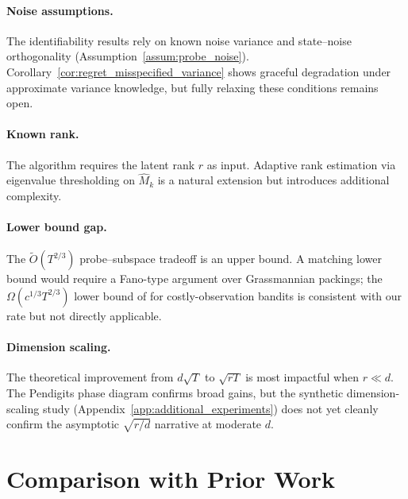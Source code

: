 \documentclass{article}
\begin{document}
\paragraph{Noise assumptions.}
The identifiability results rely on known noise variance and state--noise orthogonality (Assumption~\ref{assum:probe_noise}).
Corollary~\ref{cor:regret_misspecified_variance} shows graceful degradation under approximate variance knowledge, but fully relaxing these conditions remains open.

\paragraph{Known rank.}
The algorithm requires the latent rank $r$ as input.
Adaptive rank estimation via eigenvalue thresholding on $\widehat{M}_k$ is a natural extension but introduces additional complexity.

\paragraph{Lower bound gap.}
The $\widetilde{O}(T^{2/3})$ probe--subspace tradeoff is an upper bound.
A matching lower bound would require a Fano-type argument over Grassmannian packings; the $\Omega(c^{1/3}T^{2/3})$ lower bound of \citet{tucker2023costly} for costly-observation bandits is consistent with our rate but not directly applicable.

\paragraph{Dimension scaling.}
The theoretical improvement from $d\sqrt{T}$ to $\sqrt{rT}$ is most impactful when $r \ll d$.
The Pendigits phase diagram confirms broad gains, but the synthetic dimension-scaling study (Appendix~\ref{app:additional_experiments}) does not yet cleanly confirm the asymptotic $\sqrt{r/d}$ narrative at moderate $d$.

\section{Comparison with Prior Work}
\label{app:related_table}
\end{document}
